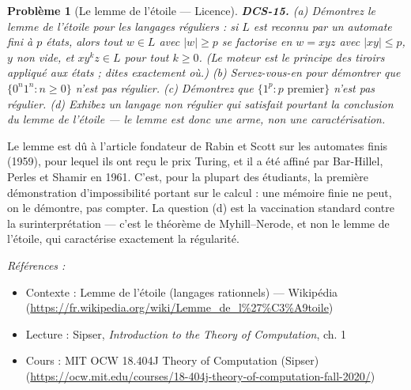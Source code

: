 \documentclass[11pt]{article}
\newtheorem{problem}{Problème}
\newenvironment{refs}{\par\small\noindent\emph{Références :}\begin{itemize}\setlength\itemsep{0pt}}{\end{itemize}\normalsize}
\begin{document}
\begin{problem}[{Le lemme de l'étoile --- Licence}]
\textbf{DCS-15.} (a) Démontrez le lemme de l'étoile pour les langages réguliers : si $L$ est reconnu par un automate fini à $p$ états, alors tout $w \in L$ avec $|w| \ge p$ se factorise en $w = xyz$ avec $|xy| \le p$, $y$ non vide, et $xy^k z \in L$ pour tout $k \ge 0$. (Le moteur est le principe des tiroirs appliqué aux états ; dites exactement où.) (b) Servez-vous-en pour démontrer que $\{0^n 1^n : n \ge 0\}$ n'est pas régulier. (c) Démontrez que $\{1^p : p \text{ premier}\}$ n'est pas régulier. (d) Exhibez un langage non régulier qui satisfait pourtant la conclusion du lemme de l'étoile --- le lemme est donc une arme, non une caractérisation.
\end{problem}

\noindent Le lemme est dû à l'article fondateur de Rabin et Scott sur les automates finis (1959), pour lequel ils ont reçu le prix Turing, et il a été affiné par Bar-Hillel, Perles et Shamir en 1961. C'est, pour la plupart des étudiants, la première démonstration d'impossibilité portant sur le calcul : une mémoire finie ne peut, on le démontre, pas compter. La question (d) est la vaccination standard contre la surinterprétation --- c'est le théorème de Myhill--Nerode, et non le lemme de l'étoile, qui caractérise exactement la régularité.

\begin{refs}
\item Contexte : Lemme de l'étoile (langages rationnels) --- Wikipédia (\url{https://fr.wikipedia.org/wiki/Lemme_de_l%27%C3%A9toile})
\item Lecture : Sipser, \textit{Introduction to the Theory of Computation}, ch. 1
\item Cours : MIT OCW 18.404J Theory of Computation (Sipser) (\url{https://ocw.mit.edu/courses/18-404j-theory-of-computation-fall-2020/})
\end{refs}

\bigskip
\end{document}
